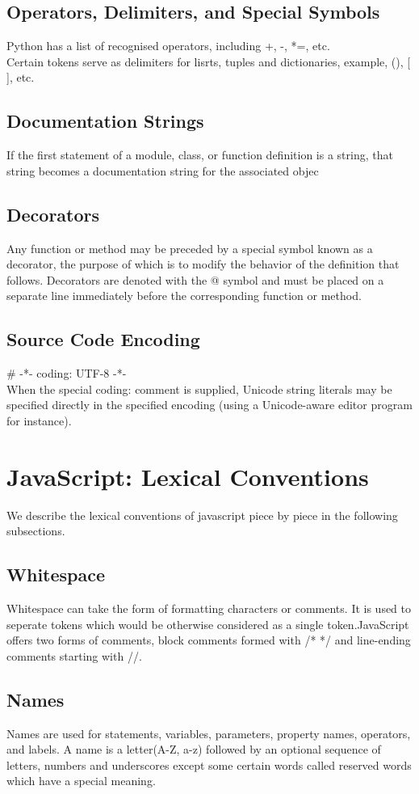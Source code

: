 \documentclass[12pt]{article}
\begin{document}
\subsection{Operators, Delimiters, and Special Symbols}
Python has a list of recognised operators, including +, -, *=, etc.\\
Certain tokens serve as delimiters for lisrts, tuples and dictionaries, example, (), [ ], etc.
\subsection{Documentation Strings}
If the first statement of a module, class, or function definition is a string, that string
becomes a documentation string for the associated objec
\subsection{Decorators}
Any function or method may be preceded by a special symbol known as a decorator,
the purpose of which is to modify the behavior of the definition that follows.
Decorators are denoted with the @ symbol and must be placed on a separate line immediately before the corresponding function or method.
\subsection{Source Code Encoding}
\# -*- coding: UTF-8 -*-\\
When the special coding: comment is supplied, Unicode string literals may be specified directly in the specified encoding (using a Unicode-aware editor program for
instance).
\newpage
\section{JavaScript: Lexical Conventions}
We describe the lexical conventions of javascript piece by piece in the following subsections.
\subsection{Whitespace}
Whitespace can take the form of formatting characters or comments. It is used to seperate tokens which would be otherwise considered as a single token.JavaScript offers two forms of comments, block comments formed with /* */ and line-ending comments starting with //.
\subsection{Names}
Names are used for statements, variables, parameters, property names, operators, and labels. A name is a letter(A-Z, a-z) followed by an optional sequence of letters, numbers and underscores except some certain words called reserved words which have a special meaning.
\end{document}
